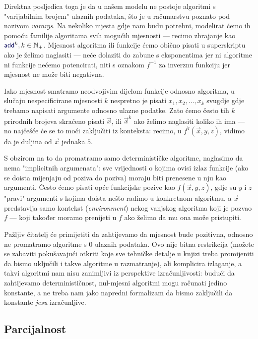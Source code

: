 Direktna posljedica toga je da u našem modelu ne postoje algoritmi s "varijabilnim brojem" ulaznih podataka, što je u računarstvu poznato pod nazivom \emph{varargs}. Na nekoliko mjesta gdje nam budu potrebni, modelirat ćemo ih pomoću familije algoritama svih mogućih mjesnosti --- recimo zbrajanje kao $\f{add}^k,k\in\N_+$. Mjesnost algoritma ili funkcije ćemo obično pisati u superskriptu ako je želimo naglasiti --- neće dolaziti do zabune s eksponentima jer ni algoritme ni funkcije nećemo potencirati, niti s oznakom $f^{-1}$ za inverznu funkciju jer mjesnost ne može biti negativna.

Iako mjesnost smatramo neodvojivim dijelom funkcije odnosno algoritma, u slučaju nespecificirane mjesnosti $k$ nespretno je pisati $x_1,x_2,\dotsc,x_k$ svugdje gdje trebamo napisati argumente odnosno ulazne podatke. Zato ćemo često tih $k$ prirodnih brojeva skraćeno pisati $\vec x$, ili $\vec x^k$ ako želimo naglasiti koliko ih ima --- no najčešće će se to moći zaključiti iz konteksta: recimo, u $f^7(\vec x,y,z)$, vidimo da je duljina od $\vec x$ jednaka $5$.

\begin{napomena}[{name=[svi argumenti moraju biti eksplicitno navedeni]}]\label{nap:blokovi}
S obzirom na to da promatramo samo determinističke algoritme, naglasimo da nema "implicitnih argumenata": sve vrijednosti o kojima ovisi izlaz funkcije (ako se doista mijenjaju od poziva do poziva) moraju biti prenesene u nju kao argumenti. Često ćemo pisati opće funkcijske pozive kao $f(\vec x,y,z)$, gdje su $y$ i $z$ "pravi" argumenti s kojima doista nešto radimo u konkretnom algoritmu, a $\vec x$ predstavlja samo kontekst (\emph{environment}) nekog vanjskog algoritma koji je pozvao $f$ --- koji također moramo prenijeti u $f$ ako želimo da mu ona može pristupiti.
\end{napomena}

Pažljiv čitatelj će primijetiti da zahtijevamo da mjesnost bude pozitivna, odnosno ne promatramo algoritme s $0$ ulaznih podataka. Ovo nije bitna restrikcija (možete se zabaviti pokušavajući otkriti koje sve tehničke detalje u knjizi treba promijeniti da bismo uključili i takve algoritme u razmatranje), ali komplicira izlaganje, a takvi algoritmi nam nisu zanimljivi iz perspektive izračunljivosti: budući da zahtijevamo determinističnost, nul-mjesni algoritmi mogu računati jedino konstante, a ne treba nam jako napredni formalizam da bismo zaključili da konstante \emph{jesu} izračunljive.

\subsection{Parcijalnost}

